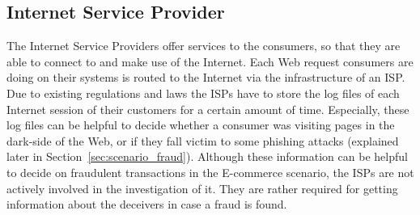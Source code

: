 
\subsection{Internet Service Provider}
\label{subsec:stakeholder_isp}

The Internet Service Providers offer services to the consumers, so that they are able to connect to and make use of the Internet. Each Web request consumers are doing on their systems is routed to the Internet via the infrastructure of an \gls{ISP}. Due to existing regulations and laws the \gls{ISP}s have to store the log files of each Internet session of their customers for a certain amount of time. Especially, these log files can be helpful to decide whether a consumer was visiting pages in the dark-side of the Web, or if they fall victim to some phishing attacks (explained later in Section~\ref{sec:scenario_fraud}). Although these information can be helpful to decide on fraudulent transactions in the \gls{E-commerce} scenario, the \gls{ISP}s are not actively involved in the investigation of it. They are rather required for getting information about the deceivers in case a fraud is found.


